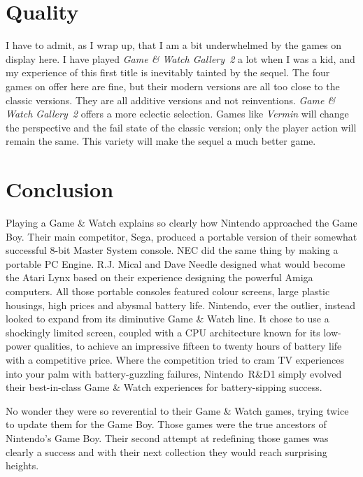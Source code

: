 \documentclass{book}
\begin{document}
\FloatBarrier\needspace{5pt}\section*{Quality}\nopagebreak[4]

I have to admit, as I wrap up, that I am a bit underwhelmed by the games on display here. I have played \emph{Game \& Watch Gallery 2} a lot when I was a kid, and my experience of this first title is inevitably tainted by the sequel. The four games on offer here are fine, but their modern versions are all too close to the classic versions. They are all additive versions and not reinventions. \emph{Game \& Watch Gallery 2} offers a more eclectic selection. Games like \emph{Vermin} will change the perspective and the fail state of the classic version; only the player action will remain the same. This variety will make the sequel a much better game.

\FloatBarrier\needspace{5pt}\section*{Conclusion}\nopagebreak[4]

Playing a Game \& Watch explains so clearly how Nintendo approached the Game Boy. Their main competitor, Sega, produced a portable version of their somewhat successful 8-bit Master System console. NEC did the same thing by making a portable PC Engine. R.J. Mical and Dave Needle designed what would become the Atari Lynx based on their experience designing the powerful Amiga computers. All those portable consoles featured colour screens, large plastic housings, high prices and abysmal battery life. Nintendo, ever the outlier, instead looked to expand from its diminutive Game \& Watch line. It chose to use a shockingly limited screen, coupled with a CPU architecture known for its low-power qualities, to achieve an impressive fifteen to twenty hours of battery life with a competitive price. Where the competition tried to cram TV experiences into your palm with battery-guzzling failures, Nintendo R\&D1 simply evolved their best-in-class Game \& Watch experiences for battery-sipping success.

No wonder they were so reverential to their Game \& Watch games, trying twice to update them for the Game Boy. Those games were the true ancestors of Nintendo’s Game Boy. Their second attempt at redefining those games was clearly a success and with their next collection they would reach surprising heights.
\end{document}
